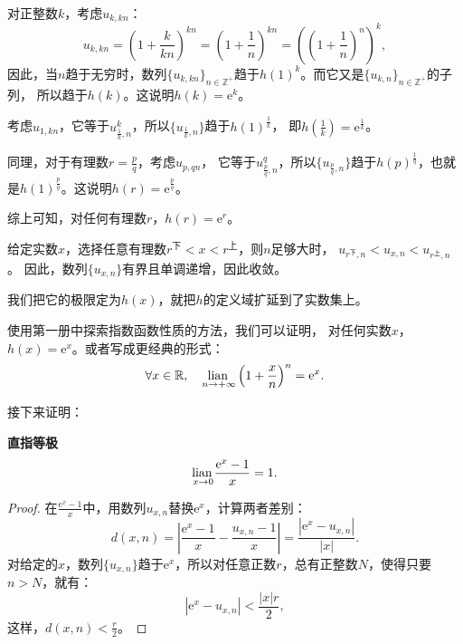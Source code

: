 \documentclass[12pt,UTF8]{ctexbook}
\begin{document}
\begin{appendix}
对正整数$k$，考虑$u_{k,kn}$：
$$ u_{k,kn} = \left(1 + \frac{k}{kn}\right)^{kn} = \left(1 + \frac{1}{n}\right)^{kn} = \left(\left(1 + \frac{1}{n}\right)^{n}\right)^{k}, $$
因此，当$n$趋于无穷时，数列$\{u_{k,kn}\}_{n\in\mathbb{Z}^+}$趋于$h(1)^k$。而它又是$\{u_{k,n}\}_{n\in\mathbb{Z}^+}$的子列，
所以趋于$h(k)$。这说明$h(k) = \mathrm{e}^k$。

考虑$u_{1,kn}$，它等于$u_{\frac{1}{k},n}^k$，所以$\{u_{\frac{1}{k},n}\}$趋于$h(1)^{\frac{1}{k}}$，
即$h(\frac{1}{k}) = \mathrm{e}^{\frac{1}{k}}$。

同理，对于有理数$r = \frac{p}{q}$，考虑$u_{p,qn}$，
它等于$u_{\frac{p}{q},n}^q$，所以$\{u_{\frac{p}{q},n}\}$趋于$h(p)^{\frac{1}{q}}$，也就是$h(1)^{\frac{p}{q}}$。这说明$h(r) = \mathrm{e}^{\frac{p}{q}}$。

综上可知，对任何有理数$r$，$h(r) = \mathrm{e}^r$。

给定实数$x$，选择任意有理数$r^{\text{下}} < x < r^{\text{上}}$，则$n$足够大时，
$u_{r^\text{下},n} < u_{x,n} < u_{r^\text{上},n}$。
因此，数列$\{u_{x,n}\}$有界且单调递增，因此收敛。

我们把它的极限定为$h(x)$，就把$h$的定义域扩延到了实数集上。

使用第一册中探索指数函数性质的方法，我们可以证明，
对任何实数$x$，$h(x) = \mathrm{e}^x$。或者写成更经典的形式：
$$ \forall x\in \mathbb{R}, \quad \underset{n\to +\infty}{\operatorname{lian}\,}  \left(1 + \frac{x}{n}\right)^n = \mathrm{e}^x. $$

接下来证明：
\begin{tm}{\textbf{直指等极}}\label{tm:b-1-50}
    $$\underset{x\to 0}{\operatorname{lian}\,} \frac{\mathrm{e}^x - 1}{x} = 1.$$
\end{tm}

\begin{proof}
    在$\frac{\mathrm{e}^x - 1}{x}$中，用数列$u_{x,n}$替换$\mathrm{e}^x$，计算两者差别：
    $$ d(x, n) = \left|\frac{\mathrm{e}^x - 1}{x} - \frac{u_{x,n} - 1}{x}\right| = \frac{\left|\mathrm{e}^x - u_{x,n}\right|}{\left|x\right|}. $$
    对给定的$x$，数列$\{u_{x,n}\}$趋于$\mathrm{e}^x$，所以对任意正数$r$，总有正整数$N$，使得只要$n>N$，就有：
    $$ \left|\mathrm{e}^x - u_{x,n}\right| < \frac{|x|r}{2},$$
    这样，$d(x, n) < \frac{r}{2}$。


\end{proof}
\end{appendix}
\end{document}
